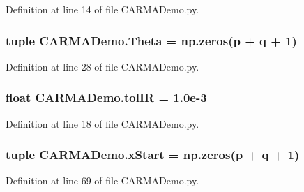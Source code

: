 Definition at line 14 of file C\-A\-R\-M\-A\-Demo.\-py.

\hypertarget{namespace_c_a_r_m_a_demo_a5110720bf5a6c1cf9a737c7ffac9774e}{
\subsubsection[{Theta}]{\setlength{\rightskip}{0pt plus 5cm}tuple C\-A\-R\-M\-A\-Demo.\-Theta = np.\-zeros({\bf p} + {\bf q} + 1)}}\label{namespace_c_a_r_m_a_demo_a5110720bf5a6c1cf9a737c7ffac9774e}


Definition at line 28 of file C\-A\-R\-M\-A\-Demo.\-py.

\hypertarget{namespace_c_a_r_m_a_demo_a8aa45a54b335d65f54192bc3fa3ba82d}{
\subsubsection[{tol\-I\-R}]{\setlength{\rightskip}{0pt plus 5cm}float C\-A\-R\-M\-A\-Demo.\-tol\-I\-R = 1.\-0e-\/3}}\label{namespace_c_a_r_m_a_demo_a8aa45a54b335d65f54192bc3fa3ba82d}


Definition at line 18 of file C\-A\-R\-M\-A\-Demo.\-py.

\hypertarget{namespace_c_a_r_m_a_demo_a4a968eb0ebec9a8a1dd2e0beb557ee70}{
\subsubsection[{x\-Start}]{\setlength{\rightskip}{0pt plus 5cm}tuple C\-A\-R\-M\-A\-Demo.\-x\-Start = np.\-zeros({\bf p} + {\bf q} + 1)}}\label{namespace_c_a_r_m_a_demo_a4a968eb0ebec9a8a1dd2e0beb557ee70}


Definition at line 69 of file C\-A\-R\-M\-A\-Demo.\-py.


